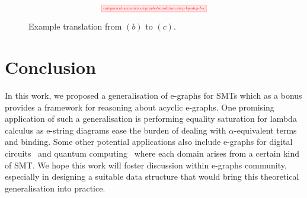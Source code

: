 \documentclass[sigconf, 9pt, nonacm]{acmart}
\theoremstyle{definition}
\begin{document}
\begin{figure*}
    \[
        \scalebox{0.5}{
        \tikzfig{categorical-semantics/egraph-translation-step-by-step-b-c}
        }
    \]
    \caption{Example translation from $(b)$ to $(c)$.}
    \label{fig:e-graph-example-b-c}
\end{figure*}

\section{Conclusion}

In this work, we proposed a generalisation of e-graphs for SMTs which as a bonus provides a framework for reasoning about acyclic e-graphs.
One promising application of such a generalisation is performing equality saturation for lambda calculus as e-string diagrams ease the burden of dealing with $\alpha$-equivalent terms and binding.
Some other potential applications also include e-graphs for digital circuits~\cite{ghica_compositional_2023} and quantum computing~\cite{coecke_interacting_2011} where each domain arises from a certain kind of SMT.
We hope this work will foster discussion within e-graphs community, especially in designing a suitable data structure that would bring this theoretical generalisation into practice.



\end{document}
